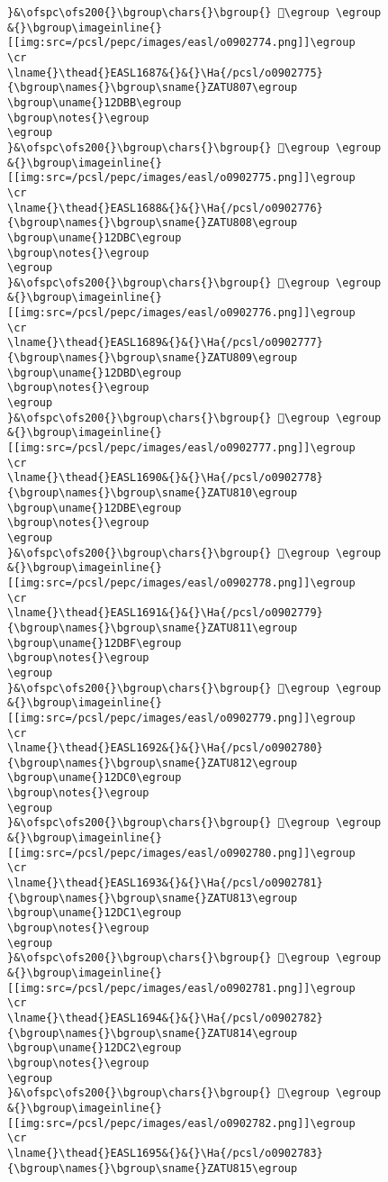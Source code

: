 \begin{verbatim}
}&\ofspc\ofs200{}\bgroup\chars{}\bgroup{} 𒶺\egroup \egroup
&{}\bgroup\imageinline{}[[img:src=/pcsl/pepc/images/easl/o0902774.png]]\egroup
\cr
\lname{}\thead{}EASL1687&{}&{}\Ha{/pcsl/o0902775}{\bgroup\names{}\bgroup\sname{}ZATU807\egroup
\bgroup\uname{}12DBB\egroup
\bgroup\notes{}\egroup
\egroup
}&\ofspc\ofs200{}\bgroup\chars{}\bgroup{} 𒶻\egroup \egroup
&{}\bgroup\imageinline{}[[img:src=/pcsl/pepc/images/easl/o0902775.png]]\egroup
\cr
\lname{}\thead{}EASL1688&{}&{}\Ha{/pcsl/o0902776}{\bgroup\names{}\bgroup\sname{}ZATU808\egroup
\bgroup\uname{}12DBC\egroup
\bgroup\notes{}\egroup
\egroup
}&\ofspc\ofs200{}\bgroup\chars{}\bgroup{} 𒶼\egroup \egroup
&{}\bgroup\imageinline{}[[img:src=/pcsl/pepc/images/easl/o0902776.png]]\egroup
\cr
\lname{}\thead{}EASL1689&{}&{}\Ha{/pcsl/o0902777}{\bgroup\names{}\bgroup\sname{}ZATU809\egroup
\bgroup\uname{}12DBD\egroup
\bgroup\notes{}\egroup
\egroup
}&\ofspc\ofs200{}\bgroup\chars{}\bgroup{} 𒶽\egroup \egroup
&{}\bgroup\imageinline{}[[img:src=/pcsl/pepc/images/easl/o0902777.png]]\egroup
\cr
\lname{}\thead{}EASL1690&{}&{}\Ha{/pcsl/o0902778}{\bgroup\names{}\bgroup\sname{}ZATU810\egroup
\bgroup\uname{}12DBE\egroup
\bgroup\notes{}\egroup
\egroup
}&\ofspc\ofs200{}\bgroup\chars{}\bgroup{} 𒶾\egroup \egroup
&{}\bgroup\imageinline{}[[img:src=/pcsl/pepc/images/easl/o0902778.png]]\egroup
\cr
\lname{}\thead{}EASL1691&{}&{}\Ha{/pcsl/o0902779}{\bgroup\names{}\bgroup\sname{}ZATU811\egroup
\bgroup\uname{}12DBF\egroup
\bgroup\notes{}\egroup
\egroup
}&\ofspc\ofs200{}\bgroup\chars{}\bgroup{} 𒶿\egroup \egroup
&{}\bgroup\imageinline{}[[img:src=/pcsl/pepc/images/easl/o0902779.png]]\egroup
\cr
\lname{}\thead{}EASL1692&{}&{}\Ha{/pcsl/o0902780}{\bgroup\names{}\bgroup\sname{}ZATU812\egroup
\bgroup\uname{}12DC0\egroup
\bgroup\notes{}\egroup
\egroup
}&\ofspc\ofs200{}\bgroup\chars{}\bgroup{} 𒷀\egroup \egroup
&{}\bgroup\imageinline{}[[img:src=/pcsl/pepc/images/easl/o0902780.png]]\egroup
\cr
\lname{}\thead{}EASL1693&{}&{}\Ha{/pcsl/o0902781}{\bgroup\names{}\bgroup\sname{}ZATU813\egroup
\bgroup\uname{}12DC1\egroup
\bgroup\notes{}\egroup
\egroup
}&\ofspc\ofs200{}\bgroup\chars{}\bgroup{} 𒷁\egroup \egroup
&{}\bgroup\imageinline{}[[img:src=/pcsl/pepc/images/easl/o0902781.png]]\egroup
\cr
\lname{}\thead{}EASL1694&{}&{}\Ha{/pcsl/o0902782}{\bgroup\names{}\bgroup\sname{}ZATU814\egroup
\bgroup\uname{}12DC2\egroup
\bgroup\notes{}\egroup
\egroup
}&\ofspc\ofs200{}\bgroup\chars{}\bgroup{} 𒷂\egroup \egroup
&{}\bgroup\imageinline{}[[img:src=/pcsl/pepc/images/easl/o0902782.png]]\egroup
\cr
\lname{}\thead{}EASL1695&{}&{}\Ha{/pcsl/o0902783}{\bgroup\names{}\bgroup\sname{}ZATU815\egroup

\end{verbatim}
